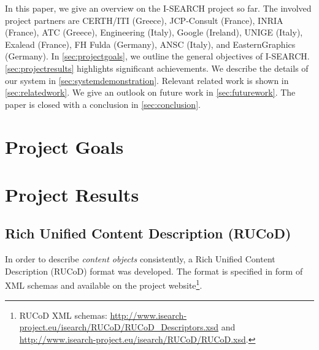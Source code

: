 \documentclass{acm_proc_article-sp}
\let\oldemph\emph
\renewcommand{\emph}[1]{\oldemph{\fontsize{9}{9}\selectfont #1}}
\newcommand{\inlinelistingsize}{\fontsize{8pt}{11pt}}
\let\oldurl\url
\renewcommand{\url}[1]{\inlinelistingsize\oldurl{#1}}
\begin{document}
In this paper, we give an overview on the \mbox{I-SEARCH} project so far.
The involved project partners are CERTH/ITI (Greece), JCP-Consult (France), INRIA (France), ATC (Greece), Engineering (Italy), Google (Ireland), UNIGE (Italy), Exalead (France), FH Fulda (Germany), ANSC (Italy), and EasternGraphics (Germany).
In \autoref{sec:projectgoals}, we outline the general objectives of  \mbox{I-SEARCH}.
\autoref{sec:projectresults} highlights significant achievements.
We describe the details of our system in \autoref{sec:systemdemonstration}.
Relevant related work is shown in \autoref{sec:relatedwork}.
We give an outlook on future work in \autoref{sec:futurework}.
The paper is closed with a conclusion in \autoref{sec:conclusion}.

\section{Project Goals} \label{sec:projectgoals}


\section{Project Results} \label{sec:projectresults}

\subsection{Rich Unified Content Description (RUCoD)}
In order to describe \emph{content objects} consistently, a Rich Unified Content Description (RUCoD) format was developed.
The format is specified in form of XML schemas and available on the project website\footnote{RUCoD XML schemas: \url{http://www.isearch-project.eu/isearch/RUCoD/RUCoD_Descriptors.xsd} and \url{http://www.isearch-project.eu/isearch/RUCoD/RUCoD.xsd}.}.
\end{document}
